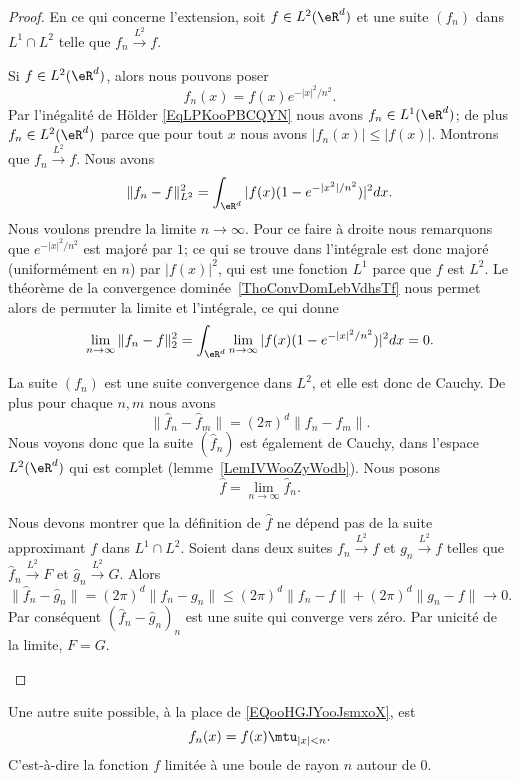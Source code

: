 \begin{proof}
	En ce qui concerne l'extension, soit \( f\in L^2(\eR^d)\) et une suite \( (f_n)\) dans \( L^1\cap L^2\) telle que \( f_n\stackrel{L^2}{\longrightarrow}f\).
	\begin{subproof}
		Si \( f\in L^2(\eR^d)\), alors nous pouvons poser
		\begin{equation}    \label{EQooHGJYooJsmxoX}
			f_n(x)=f(x) e^{-|x|^2/n^2}.
		\end{equation}
		Par l'inégalité de Hölder \eqref{EqLPKooPBCQYN} nous avons \( f_n\in L^1(\eR^d)\); de plus \( f_n\in L^2(\eR^d)\) parce que pour tout \( x\) nous avons \( | f_n(x) |\leq | f(x) |\). Montrons que \( f_n\stackrel{L^2}{\longrightarrow}f\). Nous avons
		\begin{equation}
			\| f_n-f \|_{L^2}^2=\int_{\eR^d}| f(x)(1- e^{-| x^2 |/n^2}) |^2dx.
		\end{equation}
		Nous voulons prendre la limite \( n\to \infty\). Pour ce faire à droite nous remarquons que \(  e^{-| x |^2/n^2}\) est majoré par \( 1\); ce qui se trouve dans l'intégrale est donc majoré (uniformément en \( n\)) par \( | f(x) |^2\), qui est une fonction \( L^1\) parce que \( f\) est \( L^2\). Le théorème de la convergence dominée~\ref{ThoConvDomLebVdhsTf} nous permet alors de permuter la limite et l'intégrale, ce qui donne
		\begin{equation}
			\lim_{n\to \infty} \| f_n-f \|_2^2=\int_{\eR^d}\lim_{n\to \infty} | f(x)(1- e^{-| x |^2/n^2}) |^2dx=0.
		\end{equation}


		La suite \( (f_n)\) est une suite convergence dans \( L^2\), et elle est donc de Cauchy. De plus pour chaque \( n,m\) nous avons
		\begin{equation}
			\| \hat f_n-\hat f_m \|=(2\pi)^d\| f_n-f_m \|.
		\end{equation}
		Nous voyons donc que la suite \( (\hat f_n)\) est également de Cauchy, dans l'espace \( L^2(\eR^d)\) qui est complet (lemme~\ref{LemIVWooZyWodb}). Nous posons
		\begin{equation}
			\hat f=\lim_{n\to \infty} \hat f_n.
		\end{equation}

		Nous devons montrer que la définition de \( \hat f\) ne dépend pas de la suite approximant \( f\) dans \( L^1\cap L^2\). Soient dans deux suites \( f_n\stackrel{L^2}{\longrightarrow}f\) et \( g_n\stackrel{L^2}{\longrightarrow}f\) telles que \( \hat f_n\stackrel{L^2}{\longrightarrow}F\) et \( \hat g_n\stackrel{L^2}{\longrightarrow}G\). Alors
		\begin{equation}
			\| \hat f_n-\hat g_n \|=(2\pi)^d\| f_n-g_n \|\leq (2\pi)^d\| f_n-f \|+(2\pi)^d\| g_n-f \|\to 0.
		\end{equation}
		Par conséquent \( (\hat f_n-\hat g_n)_n\) est une suite qui converge vers zéro. Par unicité de la limite, \( F=G\).
	\end{subproof}
\end{proof}

\begin{remark}
	Une autre suite possible, à la place de \eqref{EQooHGJYooJsmxoX}, est
	\begin{equation}
		f_n(x)=f(x)\mtu_{| x |<n}.
	\end{equation}
	C'est-à-dire la fonction \( f\) limitée à une boule de rayon \( n\) autour de \( 0\).
\end{remark}
